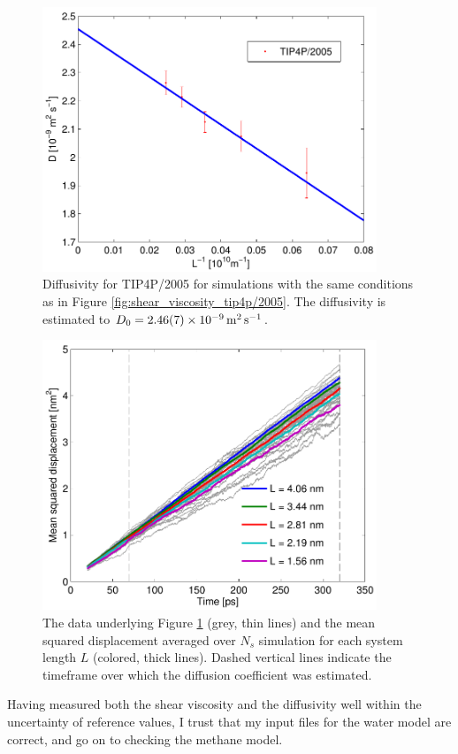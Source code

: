 \begin{figure}
\centering
\includegraphics[width=10cm]{../figures/thesis/diffusion_coefficient_tip4p_2005.pdf}
\caption{Diffusivity for TIP4P/2005 for simulations with the same conditions as in Figure \ref{fig:shear_viscosity_tip4p/2005}. The diffusivity is estimated to $D_0=\text{\SI{2.46\pm0.07d-9}{\meter\squared\per\second}}$.}
\label{fig:diffusivity_tip4p_2005}
\end{figure}

\begin{figure}
\centering
\includegraphics[width=10cm]{../figures/thesis/msq_tip4p_2005.pdf}
\caption{The data underlying Figure \ref{fig:diffusivity_tip4p_2005} (grey, thin lines) and the mean squared displacement averaged over $N_s$ simulation for each system length $L$ (colored, thick lines). Dashed vertical lines indicate the timeframe over which the diffusion coefficient was estimated.}
\label{fig:msq_tip4p_2005}
\end{figure}

Having measured both the shear viscosity and the diffusivity well within the uncertainty of reference values, I trust that my input files for the water model are correct, and go on to checking the methane model.

